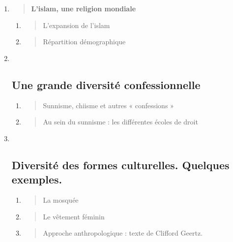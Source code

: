 \begin{enumerate}
\def\labelenumi{\Roman{enumi}.}
\item
  \begin{quote}
  \textbf{L'islam, une religion mondiale}
  \end{quote}

  \begin{enumerate}
  \def\labelenumii{\arabic{enumii}.}
  \item
    \begin{quote}
    L'expansion de l'islam
    \end{quote}
  \item
    \begin{quote}
    Répartition démographique
    \end{quote}
  \end{enumerate}
\item ~
  \hypertarget{une-grande-diversituxe9-confessionnelle}{%
  \subsection{Une grande diversité
  confessionnelle}\label{une-grande-diversituxe9-confessionnelle}}

  \begin{enumerate}
  \def\labelenumii{\arabic{enumii}.}
  \item
    \begin{quote}
    Sunnisme, chiisme et autres « confessions »
    \end{quote}
  \item
    \begin{quote}
    Au sein du sunnisme : les différentes écoles de droit
    \end{quote}
  \end{enumerate}
\item ~
  \hypertarget{diversituxe9-des-formes-culturelles.-quelques-exemples.}{%
  \subsection{Diversité des formes culturelles. Quelques
  exemples.}\label{diversituxe9-des-formes-culturelles.-quelques-exemples.}}

  \begin{enumerate}
  \def\labelenumii{\arabic{enumii}.}
  \item
    \begin{quote}
    La mosquée
    \end{quote}
  \item
    \begin{quote}
    Le vêtement féminin
    \end{quote}
  \item
    \begin{quote}
    Approche anthropologique : texte de Clifford Geertz.
    \end{quote}
  \end{enumerate}
\end{enumerate}

